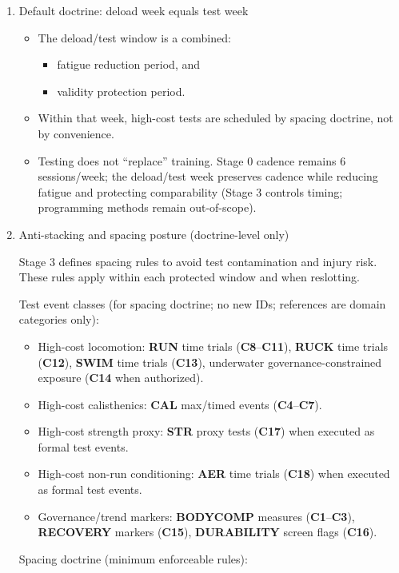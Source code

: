 \documentclass[10pt]{article}
\begin{document}
\begin{enumerate}
\item Default doctrine: deload week equals test week
\begin{itemize}
\item The deload/test window is a combined:
  \begin{itemize}
  \item fatigue reduction period, and
  \item validity protection period.
  \end{itemize}
\item Within that week, high-cost tests are scheduled by spacing doctrine, not by convenience.
\item Testing does not “replace” training. Stage 0 cadence remains 6 sessions/week; the deload/test week preserves cadence while reducing fatigue and protecting comparability (Stage 3 controls timing; programming methods remain out-of-scope).
\end{itemize}

\item Anti-stacking and spacing posture (doctrine-level only)

Stage 3 defines spacing rules to avoid test contamination and injury risk. These rules apply within each protected window and when reslotting.

Test event classes (for spacing doctrine; no new IDs; references are domain categories only):

\begin{itemize}
\item High-cost locomotion: \textbf{RUN} time trials (\textbf{C8}–\textbf{C11}), \textbf{RUCK} time trials (\textbf{C12}), \textbf{SWIM} time trials (\textbf{C13}), underwater governance-constrained exposure (\textbf{C14} when authorized).
\item High-cost calisthenics: \textbf{CAL} max/timed events (\textbf{C4}–\textbf{C7}).
\item High-cost strength proxy: \textbf{STR} proxy tests (\textbf{C17}) when executed as formal test events.
\item High-cost non-run conditioning: \textbf{AER} time trials (\textbf{C18}) when executed as formal test events.
\item Governance/trend markers: \textbf{BODYCOMP} measures (\textbf{C1}–\textbf{C3}), \textbf{RECOVERY} markers (\textbf{C15}), \textbf{DURABILITY} screen flags (\textbf{C16}).
\end{itemize}

Spacing doctrine (minimum enforceable rules):


\end{enumerate}
\end{document}
